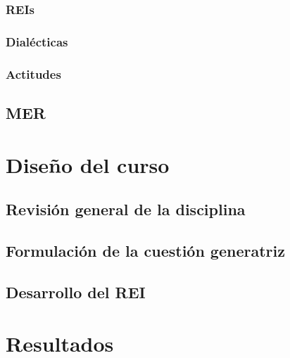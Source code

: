\documentclass[12pt,spanish,]{book}
\begin{document}
\hypertarget{reis}{%
\subsection{REIs}\label{reis}}

\hypertarget{dialuxe9cticas}{%
\subsection{Dialécticas}\label{dialuxe9cticas}}

\hypertarget{actitudes}{%
\subsection{Actitudes}\label{actitudes}}

\hypertarget{mer}{%
\section{MER}\label{mer}}

\hypertarget{diseuxf1o-del-curso}{%
\chapter{Diseño del curso}\label{diseuxf1o-del-curso}}

\hypertarget{revisiuxf3n-general-de-la-disciplina}{%
\section{Revisión general de la disciplina}\label{revisiuxf3n-general-de-la-disciplina}}

\hypertarget{formulaciuxf3n-de-la-cuestiuxf3n-generatriz}{%
\section{Formulación de la cuestión generatriz}\label{formulaciuxf3n-de-la-cuestiuxf3n-generatriz}}

\hypertarget{desarrollo-del-rei}{%
\section{Desarrollo del REI}\label{desarrollo-del-rei}}

\hypertarget{resultados}{%
\chapter{Resultados}\label{resultados}}
\end{document}
